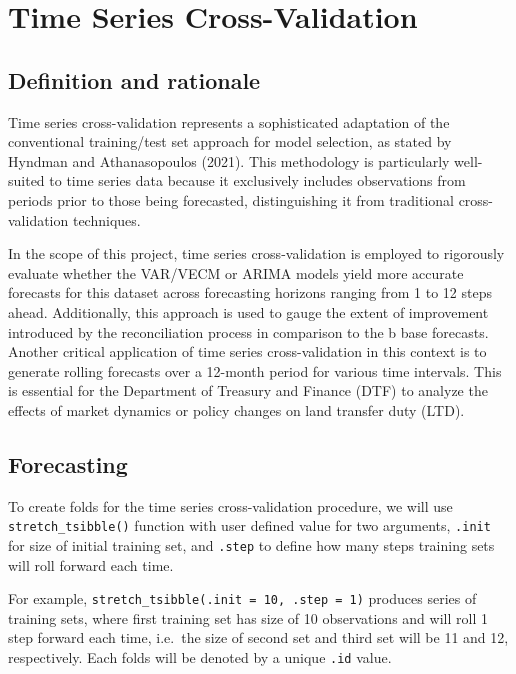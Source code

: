 \documentclass[11pt,a4paper,]{article}
\begin{document}
\section{Time Series Cross-Validation}\label{time-series-cross-validation}

\subsection{Definition and rationale}\label{definition-and-rationale}

Time series cross-validation represents a sophisticated adaptation of the conventional training/test set approach for model selection, as stated by Hyndman and Athanasopoulos (2021). This methodology is particularly well-suited to time series data because it exclusively includes observations from periods prior to those being forecasted, distinguishing it from traditional cross-validation techniques.

In the scope of this project, time series cross-validation is employed to rigorously evaluate whether the VAR/VECM or ARIMA models yield more accurate forecasts for this dataset across forecasting horizons ranging from 1 to 12 steps ahead. Additionally, this approach is used to gauge the extent of improvement introduced by the reconciliation process in comparison to the b base forecasts. Another critical application of time series cross-validation in this context is to generate rolling forecasts over a 12-month period for various time intervals. This is essential for the Department of Treasury and Finance (DTF) to analyze the effects of market dynamics or policy changes on land transfer duty (LTD).

\subsection{Forecasting}\label{forecasting}

To create folds for the time series cross-validation procedure, we will use \texttt{stretch\_tsibble()} function with user defined value for two arguments, \texttt{.init} for size of initial training set, and \texttt{.step} to define how many steps training sets will roll forward each time.

For example, \texttt{stretch\_tsibble(.init\ =\ 10,\ .step\ =\ 1)} produces series of training sets, where first training set has size of 10 observations and will roll 1 step forward each time, i.e.~the size of second set and third set will be 11 and 12, respectively. Each folds will be denoted by a unique \texttt{.id} value.
\end{document}
